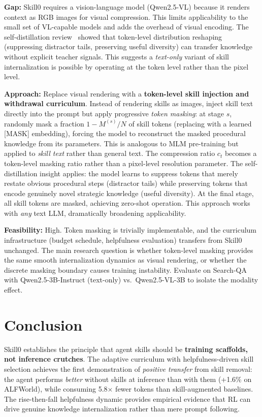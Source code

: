\documentclass[11pt]{article}
\begin{document}
\textbf{Gap:} Skill0 requires a vision-language model (Qwen2.5-VL) because it renders context as RGB images for visual compression. This limits applicability to the small set of VL-capable models and adds the overhead of visual encoding. The self-distillation review~\cite{selfdistill} showed that token-level distribution reshaping (suppressing distractor tails, preserving useful diversity) can transfer knowledge without explicit teacher signals. This suggests a \textit{text-only} variant of skill internalization is possible by operating at the token level rather than the pixel level.

\textbf{Approach:} Replace visual rendering with a \textbf{token-level skill injection and withdrawal curriculum}. Instead of rendering skills as images, inject skill text directly into the prompt but apply progressive \textit{token masking}: at stage $s$, randomly mask a fraction $1 - M^{(s)}/N$ of skill tokens (replacing with a learned [MASK] embedding), forcing the model to reconstruct the masked procedural knowledge from its parameters. This is analogous to MLM pre-training but applied to \textit{skill text} rather than general text. The compression ratio $c_t$ becomes a token-level masking ratio rather than a pixel-level resolution parameter. The self-distillation insight applies: the model learns to suppress tokens that merely restate obvious procedural steps (distractor tails) while preserving tokens that encode genuinely novel strategic knowledge (useful diversity). At the final stage, all skill tokens are masked, achieving zero-shot operation. This approach works with \textit{any} text LLM, dramatically broadening applicability.

\textbf{Feasibility:} High. Token masking is trivially implementable, and the curriculum infrastructure (budget schedule, helpfulness evaluation) transfers from Skill0 unchanged. The main research question is whether token-level masking provides the same smooth internalization dynamics as visual rendering, or whether the discrete masking boundary causes training instability. Evaluate on Search-QA with Qwen2.5-3B-Instruct (text-only) vs.\ Qwen2.5-VL-3B to isolate the modality effect.

\section{Conclusion}

Skill0 establishes the principle that agent skills should be \textbf{training scaffolds, not inference crutches}. The adaptive curriculum with helpfulness-driven skill selection achieves the first demonstration of \textit{positive transfer} from skill removal: the agent performs \textit{better} without skills at inference than with them (+1.6\% on ALFWorld), while consuming 5.8$\times$ fewer tokens than skill-augmented baselines. The rise-then-fall helpfulness dynamic provides empirical evidence that RL can drive genuine knowledge internalization rather than mere prompt following.
\end{document}
